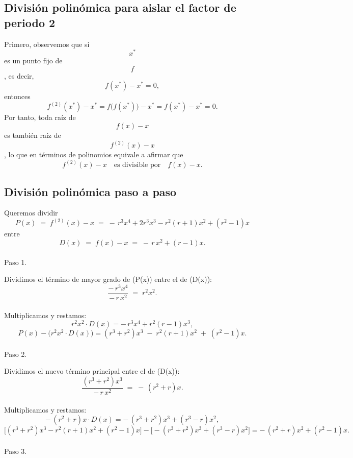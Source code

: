 \documentclass[
  10pt,
  a4paper,
  DIV=11,
  numbers=noendperiod,
  open=any]{scrreprt}
\makeatletter
\let\oldparagraph\paragraph
\renewcommand{\paragraph}{
    \@ifstar
      \xxxParagraphStar
      \xxxParagraphNoStar
  }
\newcommand{\xxxParagraphStar}[1]{\oldparagraph*{#1}\mbox{}}
\newcommand{\xxxParagraphNoStar}[1]{\oldparagraph{#1}\mbox{}}
\numberwithin{equation}{chapter}
\numberwithin{equation}{chapter}
\renewcommand{\[}{\begin{equation}}
\renewcommand{\]}{\end{equation}}
\makeatother
\begin{document}
\subsection{División polinómica para aislar el factor de periodo
2}\label{divisiuxf3n-polinuxf3mica-para-aislar-el-factor-de-periodo-2}

Primero, observemos que si \[x^*\] es un punto fijo de \[f\], es decir,
\[
f(x^*) - x^* = 0,
\] entonces \[
f^{(2)}(x^*) - x^* 
= f\bigl(f(x^*)\bigr) - x^* 
= f(x^*) - x^* 
= 0.
\] Por tanto, toda raíz de \[f(x)-x\] es también raíz de
\[f^{(2)}(x)-x\], lo que en términos de polinomios equivale a afirmar
que \[
f^{(2)}(x)-x
\quad\text{es divisible por}\quad
f(x)-x.
\]

\subsection*{División polinómica paso a paso}

Queremos dividir\\
\[
P(x) \;=\; f^{(2)}(x)-x 
         \;=\; -\,r^3x^4 + 2r^3x^3 - r^2(r+1)x^2 + (r^2-1)x
\] entre\\
\[
D(x) \;=\; f(x)-x 
         \;=\; -\,r\,x^2 + (r-1)x.
\]

\paragraph{Paso 1.}

Dividimos el término de mayor grado de (P(x)) entre el de (D(x)): \[
\frac{-\,r^3x^4}{-\,r\,x^2}
\;=\;
r^2x^2.
\]\\
Multiplicamos y restamos: \[
r^2x^2\cdot D(x)
= -\,r^3x^4 + r^2(r-1)x^3,
\] \[
P(x)-\bigl(r^2x^2\cdot D(x)\bigr)
= (r^3+r^2)x^3 \;-\; r^2(r+1)x^2 \;+\;(r^2-1)x.
\]

\paragraph{Paso 2.}

Dividimos el nuevo término principal entre el de (D(x)): \[
\frac{(r^3+r^2)x^3}{-\,r\,x^2}
\;=\;
-\,(r^2+r)x.
\]\\
Multiplicamos y restamos: \[
-\,(r^2+r)x\cdot D(x)
= -\,(r^3+r^2)x^3 + (r^3-r)x^2,
\] \[
\bigl[(r^3+r^2)x^3 - r^2(r+1)x^2 + (r^2-1)x\bigr]
-
\bigl[-(r^3+r^2)x^3 + (r^3-r)x^2\bigr]
= -\,(r^2+r)x^2 + (r^2-1)x.
\]

\paragraph{Paso 3.}
\end{document}
